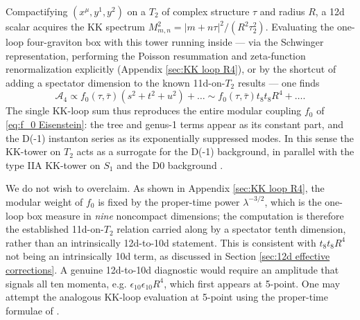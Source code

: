 Compactifying $(x^\mu,y^1,y^2)$ on a $T_2$ of complex structure $\tau$ and radius $R$, a 12d scalar acquires the KK spectrum $M_{m,n}^2=|m+n\tau|^2/(R^2\tau_2^2)$.
Evaluating the one-loop four-graviton box with this tower running inside --- via the Schwinger representation, performing the Poisson resummation and zeta-function renormalization explicitly (Appendix \ref{sec:KK loop R4}), or by the shortcut of adding a spectator dimension to the known 11d-on-$T_2$ results \cite{Green:1997as,Beccaria:2023hhi} --- one finds
\begin{equation}
\mathcal{A}_4
\propto  f_0(\tau,\bar\tau)(s^2+t^2+u^2)+\ldots
\sim f_0(\tau,\bar\tau)t_8t_8R^4+\ldots.
\end{equation}
The single KK-loop sum thus reproduces the entire modular coupling $f_0$ of \eqref{eq:f_0 Eisenstein}: the tree and genus-1 terms appear as its constant part, and the D(-1) instanton series as its exponentially suppressed modes.
In this sense the KK-tower on $T_2$ acts as a surrogate for the D(-1) background, in parallel with the type IIA KK-tower on $S_1$ and the D0 background \cite{Green:1997as}.

We do not wish to overclaim.
As shown in Appendix \ref{sec:KK loop R4}, the modular weight of $f_0$ is fixed by the proper-time power $\lambda^{-3/2}$, which is the one-loop box measure in \emph{nine} noncompact dimensions; the computation is therefore the established 11d-on-$T_2$ relation \cite{Green:1997as} carried along by a spectator tenth dimension, rather than an intrinsically 12d-to-10d statement.
This is consistent with $t_8t_8R^4$ not being an intrinsically 10d term, as discussed in Section \ref{sec:12d effective corrections}.
A genuine 12d-to-10d diagnostic would require an amplitude that signals all ten momenta, e.g. $\epsilon_{10}\epsilon_{10}R^4$, which first appears at 5-point.
One may attempt the analogous KK-loop evaluation at 5-point using the proper-time formulae of \cite{Minasian:2015bxa,Green:1999by,Liu:2022bfg}.